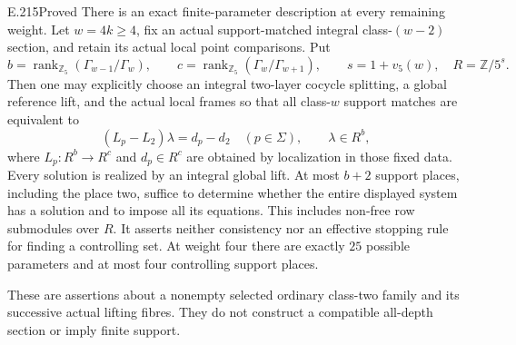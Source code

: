 \begin{result}{E.215}{Proved}
There is an exact finite-parameter description at every remaining weight.
Let $w=4k\ge4$, fix an actual support-matched integral class-$(w-2)$
section, and retain its actual local point comparisons. Put
\[
 b=\operatorname{rank}_{\mathbb Z_5}(\Gamma_{w-1}/\Gamma_w),
 \qquad c=\operatorname{rank}_{\mathbb Z_5}(\Gamma_w/\Gamma_{w+1}),
 \qquad s=1+v_5(w),\quad R=\mathbb Z/5^s.
 \tag{E.215.3}
\]
Then one may explicitly choose an integral two-layer cocycle splitting,
a global reference lift, and the actual local frames so that all
class-$w$ support matches are equivalent to
\[
            (L_p-L_2)\lambda=d_p-d_2
            \quad(p\in\Sigma),\qquad \lambda\in R^b,
 \tag{E.215.4}
\]
where $L_p:R^b\to R^c$ and $d_p\in R^c$ are obtained by localization
in those fixed data. Every solution is realized by an integral global
lift. At most $b+2$ support places, including the place two, suffice to
determine whether the entire displayed system has a solution and to
impose all its equations. This includes non-free row submodules over
$R$. It asserts neither consistency nor an effective stopping rule for
finding a controlling set. At weight four there are exactly $25$
possible parameters and at most four controlling support places.

These are assertions about a nonempty selected ordinary class-two family
and its successive actual lifting fibres. They do not construct a
compatible all-depth section or imply finite support.
\end{result}

